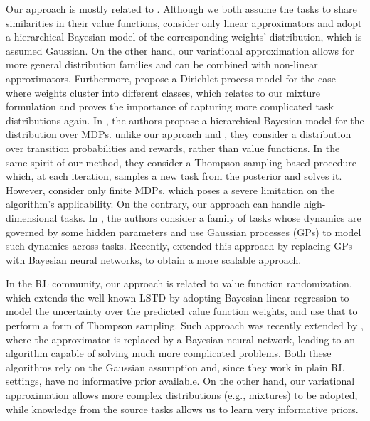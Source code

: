 \documentclass{article}
\begin{document}
Our approach is mostly related to \cite{lazaric2010bayesian}. Although we both assume the tasks to share similarities in their value functions, \cite{lazaric2010bayesian} consider only linear approximators and adopt a hierarchical Bayesian model of the corresponding weights' distribution, which is assumed Gaussian. On the other hand, our variational approximation allows for more general distribution families and can be combined with non-linear approximators. Furthermore, \cite{lazaric2010bayesian} propose a Dirichlet process model for the case where weights cluster into different classes, which relates to our mixture formulation and proves the importance of capturing more complicated task distributions again. In \cite{wilson2007multi}, the authors propose a hierarchical Bayesian model for the distribution over MDPs. unlike our approach and \cite{lazaric2010bayesian}, they consider a distribution over transition probabilities and rewards, rather than value functions. In the same spirit of our method, they consider a Thompson sampling-based procedure which, at each iteration, samples a new task from the posterior and solves it. However, \cite{wilson2007multi} consider only finite MDPs, which poses a severe limitation on the algorithm's applicability. On the contrary, our approach can handle high-dimensional tasks. In \cite{doshi2016hidden}, the authors consider a family of tasks whose dynamics are governed by some hidden parameters and use Gaussian processes (GPs) to model such dynamics across tasks. Recently, \cite{killian2017robust} extended this approach by replacing GPs with Bayesian neural networks, to obtain a more scalable approach.

In the RL community, our approach is related to value function randomization\cite{osband2014generalization}, which extends the well-known LSTD \cite{boyan1999least} by adopting Bayesian linear regression to model the uncertainty over the predicted value function weights, and use that to perform a form of Thompson sampling. Such approach was recently extended by \cite{azizzadenesheli2018efficient}, where the approximator is replaced by a Bayesian neural network, leading to an algorithm capable of solving much more complicated problems. Both these algorithms rely on the Gaussian assumption and, since they work in plain RL settings, have no informative prior available. On the other hand, our variational approximation allows more complex distributions (e.g., mixtures) to be adopted, while knowledge from the source tasks allows us to learn very informative priors.
\end{document}
